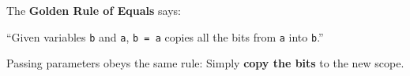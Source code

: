 The \textbf{Golden Rule of Equals} says:

``Given variables \texttt{b} and \texttt{a}, \texttt{b = a} copies all the bits from \texttt{a} into \texttt{b}.''

Passing parameters obeys the same rule: Simply \textbf{copy the bits} to the new scope.